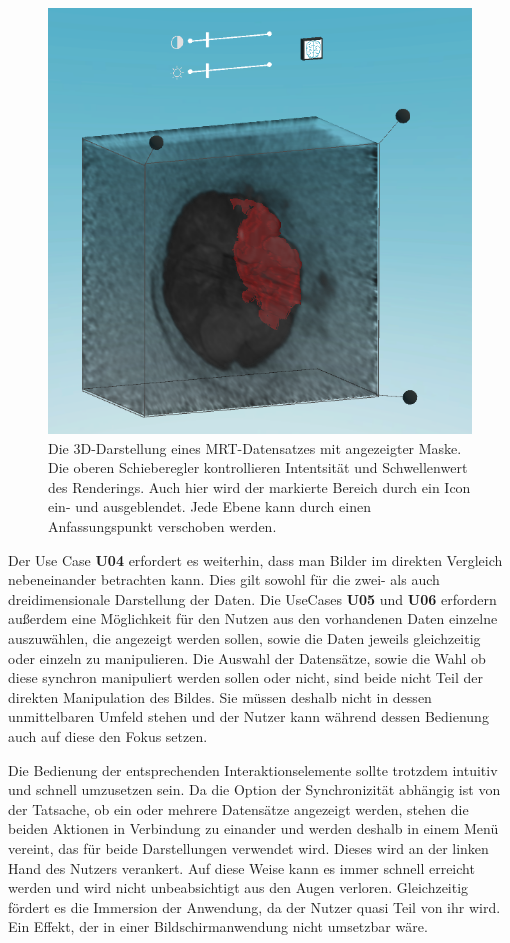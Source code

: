 \begin{figure}[!htb]
	\centering
	\includegraphics[width=0.5\linewidth]{images/mARt3d.png}
	\caption{Die 3D-Darstellung eines MRT-Datensatzes mit angezeigter Maske. Die oberen Schieberegler kontrollieren Intentsität und Schwellenwert des Renderings. Auch hier wird der markierte Bereich durch ein Icon ein- und ausgeblendet. Jede Ebene kann durch einen Anfassungspunkt verschoben werden.}
	\label{img:mARt3d}
\end{figure}
\FloatBarrier

Der Use Case \textbf{U04} erfordert es weiterhin, dass man Bilder im direkten Vergleich nebeneinander betrachten kann. Dies gilt sowohl für die zwei- als auch dreidimensionale Darstellung der Daten. Die UseCases \textbf{U05} und \textbf{U06} erfordern außerdem eine Möglichkeit für den Nutzen aus den vorhandenen Daten einzelne auszuwählen, die angezeigt werden sollen, sowie die Daten jeweils gleichzeitig oder einzeln zu manipulieren. 
Die Auswahl der Datensätze, sowie die Wahl ob diese synchron manipuliert werden sollen oder nicht, sind beide nicht Teil der direkten Manipulation des Bildes. Sie müssen deshalb nicht in dessen unmittelbaren Umfeld stehen und der Nutzer kann während dessen Bedienung auch auf diese den Fokus setzen.
 
Die Bedienung der entsprechenden Interaktionselemente sollte trotzdem intuitiv und schnell umzusetzen sein. Da die Option der Synchronizität abhängig ist von der Tatsache, ob ein oder mehrere Datensätze angezeigt werden, stehen die beiden Aktionen in Verbindung zu einander und werden deshalb in einem Menü vereint, das für beide Darstellungen verwendet wird. Dieses wird an der linken Hand des Nutzers verankert. Auf diese Weise kann es immer schnell erreicht werden und wird nicht unbeabsichtigt aus den Augen verloren. Gleichzeitig fördert es die Immersion der Anwendung, da der Nutzer quasi Teil von ihr wird. Ein Effekt, der in einer Bildschirmanwendung nicht umsetzbar wäre. 

